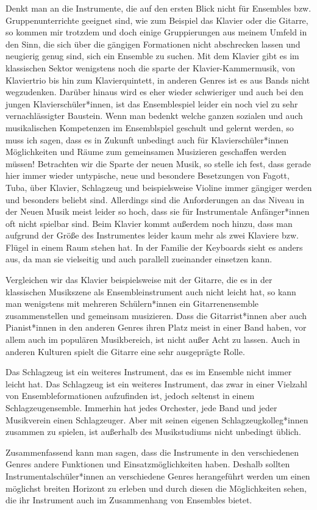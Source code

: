 Denkt man an die Instrumente, die auf den ersten Blick nicht für Ensembles bzw.
Gruppenunterrichte geeignet sind, wie zum Beispiel das Klavier oder die Gitarre,
so kommen mir trotzdem und doch einige Gruppierungen aus meinem Umfeld
in den Sinn, die sich über die gängigen Formationen nicht abschrecken lassen und
neugierig genug sind, sich ein Ensemble zu suchen. Mit dem Klavier gibt es im
klassischen Sektor wenigstens noch die sparte der Klavier-Kammermusik, von
Klaviertrio bis hin zum Klavierquintett, in anderen Genres ist es aus Bands
nicht wegzudenken. Darüber hinaus wird es eher wieder schwieriger und auch bei
den jungen Klavierschüler*innen, ist das Ensemblespiel leider ein noch viel zu
sehr vernachlässigter Baustein. Wenn man bedenkt welche ganzen sozialen und auch
musikalischen Kompetenzen im Ensemblspiel geschult und gelernt werden, so muss
ich sagen, dass es in Zukunft unbedingt auch für Klavierschüler*innen
Möglichkeiten und Räume zum gemeinsamen Musizieren geschaffen werden müssen!
Betrachten wir die Sparte der neuen Musik, so stelle ich fest, dass gerade hier
immer wieder untypische, neue und besondere Besetzungen von Fagott, Tuba, über Klavier,
Schlagzeug und beispielsweise Violine immer gängiger werden und besonders beliebt
sind. Allerdings sind die Anforderungen an das Niveau in der Neuen Musik meist
leider so hoch, dass sie für Instrumentale Anfänger*innen oft nicht spielbar
sind. Beim Klavier kommt außerdem noch hinzu, dass man aufgrund der Größe des
Instrumentes leider kaum mehr als zwei Klaviere bzw. Flügel in einem Raum stehen
hat. In der Familie der Keyboards sieht es anders aus, da man sie vielseitig
und auch parallell zueinander einsetzen kann.

Vergleichen wir das Klavier beispielsweise mit der Gitarre, die es in der
klassischen Musikszene als Ensembleinstrument auch nicht leicht hat, so kann man
wenigstens mit mehreren Schülern*innen ein Gitarrenensemble zusammenstellen und
gemeinsam musizieren. Dass die Gitarrist*innen aber auch Pianist*innen in den
anderen Genres ihren Platz meist in einer Band haben, vor allem auch im
populären Musikbereich, ist nicht außer Acht zu lassen. Auch in anderen Kulturen
spielt die Gitarre eine sehr ausgeprägte Rolle.

Das Schlagzeug ist ein weiteres Instrument, das es im Ensemble nicht immer
leicht hat. Das Schlagzeug ist ein weiteres Instrument, das zwar in einer
Vielzahl von Ensembleformationen aufzufinden ist, jedoch seltenst in einem
Schlagzeugensemble. Immerhin hat jedes Orchester, jede Band und jeder
Musikverein einen Schlagzeuger. Aber mit seinen eigenen Schlagzeugkolleg*innen
zusammen zu spielen, ist außerhalb des Musikstudiums nicht unbedingt üblich. 

Zusammenfassend kann man sagen, dass die Instrumente in den verschiedenen Genres
andere Funktionen und Einsatzmöglichkeiten haben. Deshalb sollten
Instrumentalschüler*innen an verschiedene Genres herangeführt werden um einen
möglichst breiten Horizont zu erleben und durch diesen die Möglichkeiten sehen,
die ihr Instrument auch im Zusammenhang von Ensembles bietet. 





